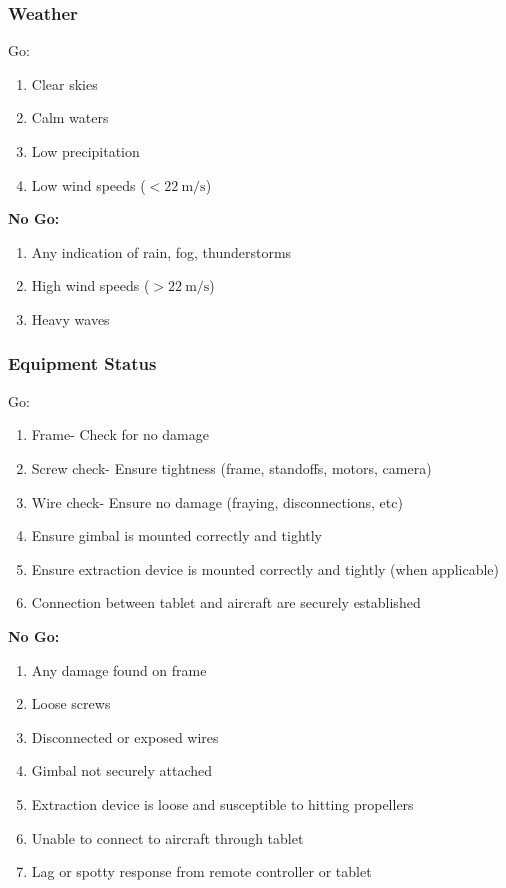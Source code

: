 \subsubsection{Weather}
Go: 
\begin{enumerate}
\setlength{\itemsep}{0em}
\setlength{\parskip}{0em}
\item Clear skies
\item Calm waters
\item Low precipitation
\item  Low wind speeds ($<\SI{22}{\meter\per\second}$)
\end{enumerate}

\textbf{No Go:}
\begin{enumerate}
\setlength{\itemsep}{0em}
\setlength{\parskip}{0em}
\item Any indication of rain, fog, thunderstorms
\item High wind speeds ($>\SI{22}{\meter\per\second}$)
\item Heavy waves
\end{enumerate}

\subsubsection{Equipment Status}
Go: 
\begin{enumerate}
\setlength{\itemsep}{0em}
\setlength{\parskip}{0em}
\item Frame- Check for no damage
\item Screw check- Ensure tightness (frame, standoffs, motors, camera)
\item Wire check- Ensure no damage (fraying, disconnections, etc)
\item Ensure gimbal is mounted correctly and tightly
\item Ensure extraction device is mounted correctly and tightly (when applicable)
\item Connection between tablet and aircraft are securely established
\end{enumerate}

\textbf{No Go:}
\begin{enumerate}
\setlength{\itemsep}{0em}
\setlength{\parskip}{0em}
\item Any damage found on frame 
\item Loose screws
\item Disconnected or exposed wires 
\item Gimbal not securely attached
\item Extraction device is loose and susceptible to hitting propellers
\item Unable to connect to aircraft through tablet
\item Lag or spotty response from remote controller or tablet
\end{enumerate}

